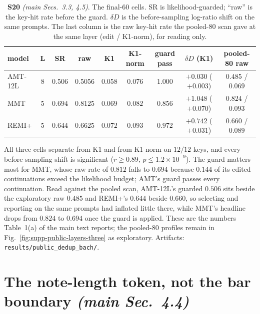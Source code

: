 \documentclass{article}
\begin{document}
\begin{table}[!t]
\centering
\caption{\textbf{S20} \textit{(main Secs.~3.3, 4.5)}. The final-$60$ cells. SR is
likelihood-guarded; ``raw'' is the key-hit rate before the guard. $\delta D$ is the
before-sampling log-ratio shift on the same prompts. The last column is the raw key-hit
rate the pooled-$80$ scan gave at the same layer (edit / K1-norm), for reading only.}
\label{tab:supp-dedup}
\footnotesize
\setlength{\tabcolsep}{3pt}
\begin{tabular}{@{}lcccccccc@{}}
\toprule
model & L & SR & raw & K1 & K1-norm & guard pass & $\delta D$ (K1) & pooled-80 raw\\
\midrule
AMT-12L & 8 & $0.506$ & $0.5056$ & $0.058$ & $0.076$ & $1.000$ & $+0.030$ ($+0.003$) & $0.485$ / $0.069$\\
MMT     & 5 & $0.694$ & $0.8125$ & $0.069$ & $0.082$ & $0.856$ & $+1.048$ ($+0.070$) & $0.824$ / $0.093$\\
REMI+   & 5 & $0.644$ & $0.6625$ & $0.072$ & $0.093$ & $0.972$ & $+0.742$ ($+0.031$) & $0.660$ / $0.089$\\
\bottomrule
\end{tabular}
\end{table}

All three cells separate from K1 and from K1-norm on $12/12$ keys, and every
before-sampling shift is significant ($r \ge 0.89$, $p \le 1.2\times10^{-9}$). The
guard matters most for MMT, whose raw rate of $0.812$ falls to $0.694$ because $0.144$
of its edited continuations exceed the likelihood budget; AMT's guard passes every
continuation. Read against the pooled scan, AMT-12L's guarded $0.506$ sits beside the
exploratory raw $0.485$ and REMI+'s $0.644$ beside $0.660$, so selecting and reporting
on the same prompts had inflated little there, while MMT's headline drops from $0.824$
to $0.694$ once the guard is applied. These are the numbers Table~1(a) of the main text reports; the pooled-$80$
profiles remain in Fig.~\ref{fig:supp-public-layers-three} as exploratory.
Artifacts: \texttt{results/public\_dedup\_bach/}.

\section{The note-length token, not the bar boundary \normalfont\textit{(main Sec.~4.4)}}
\label{sec:bardur}
\end{document}
